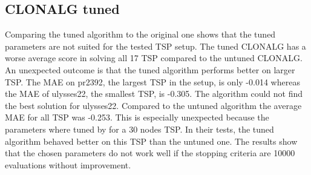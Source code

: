 \subsection{CLONALG tuned}
Comparing the tuned algorithm to the original one shows that the tuned parameters are not suited for the tested TSP setup. The tuned CLONALG has a worse average score in solving all 17 TSP compared to the untuned CLONALG. An unexpected outcome is that the tuned algorithm performs better on larger TSP. The MAE on pr2392, the largest TSP in the setup, is only -0.014 whereas the MAE of ulysses22, the smallest TSP, is -0.305. The algorithm could not find the best solution for ulysses22. Compared to the untuned algorithm the average MAE for all TSP was -0.253. This is especially unexpected because the parameters where tuned by \cite{DEC02} for a 30 nodes TSP. In their tests, the tuned algorithm behaved better on this TSP than the untuned one. The results show that the chosen parameters do not work well if the stopping criteria are 10000 evaluations without improvement.
